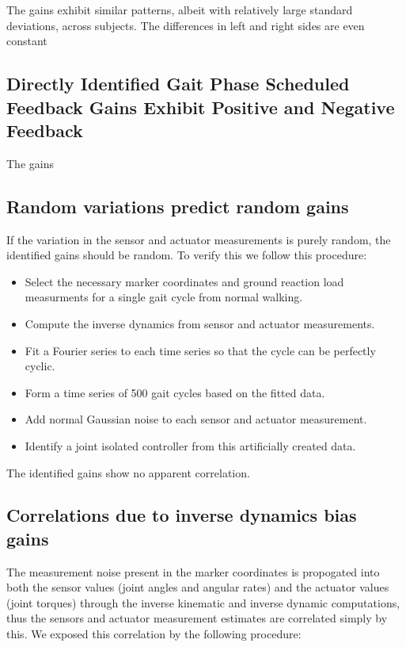 \documentclass{article}
\begin{document}
The gains exhibit similar patterns, albeit with relatively large standard
deviations, across subjects. The differences in left and right sides are even
constant

\subsection{Directly Identified Gait Phase Scheduled Feedback Gains Exhibit Positive
  and Negative Feedback}
%
The gains 
\subsection*{Random variations predict random gains}
%
If the variation in the sensor and actuator measurements is purely random, the
identified gains should be random. To verify this we follow this procedure:

\begin{itemize}
  \item Select the necessary marker coordinates and ground reaction load
    measurments for a single gait cycle from normal walking.
  \item Compute the inverse dynamics from sensor and actuator measurements.
  \item Fit a Fourier series to each time series so that the cycle can be
    perfectly cyclic.
  \item Form a time series of 500 gait cycles based on the fitted data.
  \item Add normal Gaussian noise to each sensor and actuator measurement.
  \item Identify a joint isolated controller from this artificially created
    data.
\end{itemize}

The identified gains show no apparent correlation.


\subsection*{Correlations due to inverse dynamics bias gains}
%
The measurement noise present in the marker coordinates is propogated into both
the sensor values (joint angles and angular rates) and the actuator values
(joint torques) through the inverse kinematic and inverse dynamic computations,
thus the sensors and actuator measurement estimates are correlated simply by
this. We exposed this correlation by the following procedure:
\end{document}
